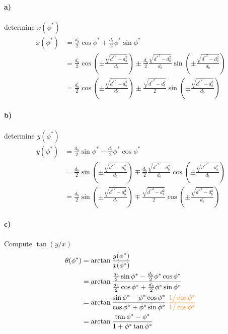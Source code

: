 \paragraph{a)} determine $x(\phi^*)$
\begin{subequations}
\begin{align}
    x(\phi^*)   &=  \frac{d_b}{2}\cos\phi^* + \frac{d_b}{2}\phi^*\sin\phi^*\\
                &=  \frac{d_b}{2}\cos\left(\pm\frac{\sqrt{{d^*}^2 - d_b^2}}{d_b}\right)
                \pm \frac{d_b}{2}\frac{\sqrt{{d^*}^2 - d_b^2}}{d_b}\sin\left(\pm\frac{\sqrt{{d^*}^2 - d_b^2}}{d_b}\right) \\
                &=  \frac{d_b}{2}\cos\left(\pm\frac{\sqrt{{d^*}^2 - d_b^2}}{d_b}\right)
                \pm \frac{\sqrt{{d^*}^2 - d_b^2}}{2}\sin\left(\pm\frac{\sqrt{{d^*}^2 - d_b^2}}{d_b}\right)
\end{align}
\end{subequations}

\paragraph{b)} determine $y(\phi^*)$
\begin{subequations}
\begin{align}
    y(\phi^*)   &=  \frac{d_b}{2}\sin\phi^* - \frac{d_b}{2}\phi^*\cos\phi^*\\
                &=  \frac{d_b}{2}\sin\left(\pm\frac{\sqrt{{d^*}^2 - d_b^2}}{d_b}\right)
                \mp \frac{d_b}{2}\frac{\sqrt{{d^*}^2 - d_b^2}}{d_b}\cos\left(\pm\frac{\sqrt{{d^*}^2 - d_b^2}}{d_b}\right) \\
                &=  \frac{d_b}{2}\sin\left(\pm\frac{\sqrt{{d^*}^2 - d_b^2}}{d_b}\right)
                \mp \frac{\sqrt{{d^*}^2 - d_b^2}}{2}\cos\left(\pm\frac{\sqrt{{d^*}^2 - d_b^2}}{d_b}\right)
\end{align}
\end{subequations}

\paragraph{c)} Compute $\tan(y/x)$
\begin{subequations}
\begin{align}
    \theta(\phi^*)  &= \arctan\frac{y(\phi^*)}{x(\phi^*)} \\
                    &= \arctan\frac{\frac{d_b}{2}\sin\phi^* - \frac{d_b}{2}\phi^*\cos\phi^*}{\frac{d_b}{2}\cos\phi^* + \frac{d_b}{2}\phi^*\sin\phi^*} \\
                    &= \arctan\frac{\sin\phi^* - \phi^*\cos\phi^*}{\cos\phi^* + \phi^*\sin\phi^*} 
                        \textcolor{orange}{\cdot \frac{1/\cos\phi^*}{1/\cos\phi^*}}\\
                    &= \arctan\frac{\tan\phi^* - \phi^*}{1 + \phi^*\tan\phi^*}
\label{eq:involute_angle_unsimplified} 
\end{align}
\end{subequations}

